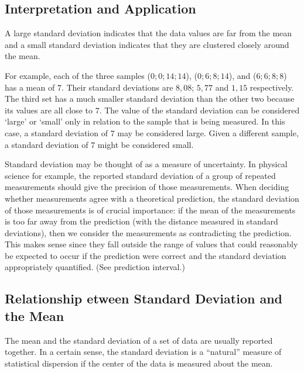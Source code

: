 \subsection{Interpretation and Application}

A large standard deviation indicates that the data values are far from the mean and a small standard deviation indicates that they are clustered closely around the mean.

For example, each of the three samples ($0; 0; 14; 14$), ($0; 6; 8; 14$), and ($6; 6; 8; 8$) has a mean of $7$. Their standard deviations are $8,08$; $5,77$ and $1,15$ respectively. The third set has a much smaller standard deviation than the other two because its values are all close to $7$. The value of the standard deviation can be considered `large' or `small' only in relation to the sample that is being measured. In this case, a standard deviation of $7$ may be considered large. Given a different sample, a standard deviation of $7$ might be considered small.

Standard deviation may be thought of as a measure of uncertainty. In physical science for example, the reported standard deviation of a group of repeated measurements should give the precision of those measurements. When deciding whether measurements agree with a theoretical prediction, the standard deviation of those measurements is of crucial importance: if the mean of the measurements is too far away from the prediction (with the distance measured in standard deviations), then we consider the measurements as contradicting the prediction. This makes sense since they fall outside the range of values that could reasonably be expected to occur if the prediction were correct and the standard deviation appropriately quantified. (See prediction interval.)

\subsection{Relationship etween Standard Deviation and the Mean}

The mean and the standard deviation of a set of data are usually reported together. In a certain sense, the standard deviation is a ``natural'' measure of statistical dispersion if the center of the data is measured about the mean. 

